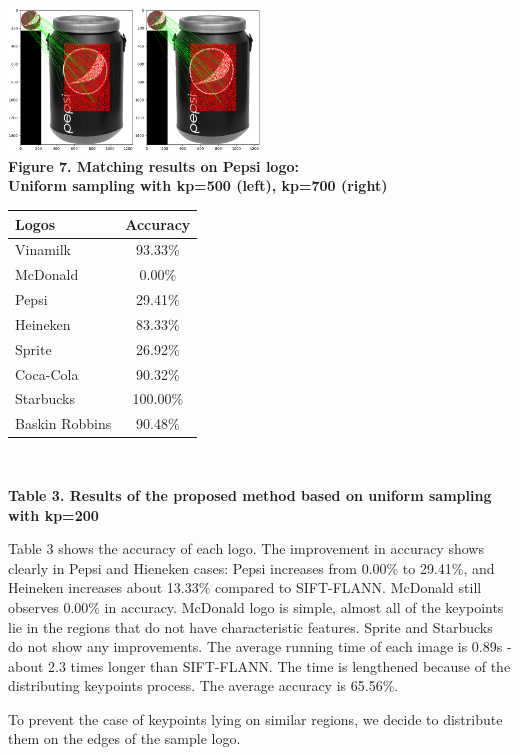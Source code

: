 \documentclass[letterpaper, 10 pt, conference]{ieeeconf}  %
\begin{document}
\begin{center}
\includegraphics[width=0.5\textwidth]{sosanh500_700.png} \\
\textbf{Figure 7. Matching results on Pepsi logo:\\ Uniform sampling with kp=500 (left), kp=700 (right)}
\end{center}
\begin{center}
\begin{tabular}{|l|c|}
\hline
Logos & Accuracy\\ \hline
Vinamilk & 93.33\% \\ \hline
McDonald & 0.00\% \\ \hline
Pepsi & 29.41\% \\ \hline
Heineken & 83.33\% \\ \hline
Sprite & 26.92\% \\ \hline
Coca-Cola & 90.32\% \\ \hline
Starbucks & 100.00\% \\ \hline
Baskin Robbins & 90.48\% \\ \hline 
\end{tabular}
\\
\end{center}
\begin{center}
\textbf{Table 3. Results of the proposed method based on uniform sampling with kp=200}
\end{center}
\par
Table 3 shows the accuracy of each logo. The improvement in accuracy shows clearly in Pepsi and Hieneken cases: Pepsi increases from 0.00\% to 29.41\%, and Heineken increases about 13.33\% compared to SIFT-FLANN. McDonald still observes 0.00\% in accuracy. McDonald logo is simple, almost all of the keypoints lie in the regions that do not have characteristic features. Sprite and Starbucks do not show any improvements. The average running time of each image is 0.89s - about 2.3 times longer than SIFT-FLANN. The time is lengthened because of the distributing keypoints process. The average accuracy is 65.56\%.\par
To prevent the case of keypoints lying on similar regions, we decide to distribute them on the edges of the sample logo.
\end{document}
